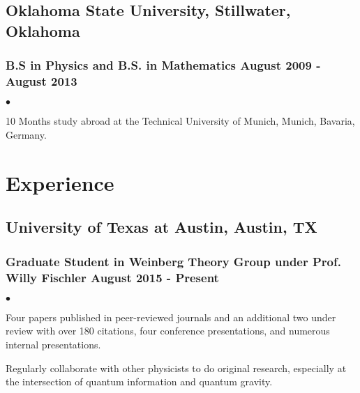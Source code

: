\documentclass[letterpaper]{article}
\renewenvironment{itemize}{
  \begin{list}{$\bullet$}{
    \setlength{\itemsep}{0em}
    \setlength{\parskip}{0em}
    \setlength{\parsep}{0em} 
    \setlength{\topsep}{0em} 
  }
}{
  \end{list}
}
\begin{document}
\subsection*{Oklahoma State University, Stillwater, Oklahoma}
\subsubsection*{B.S in Physics and B.S. in Mathematics \hfill August 2009 - August 2013}

\begin{itemize}
\item 10 Months study abroad at the Technical University of Munich, Munich, Bavaria, Germany.
\end{itemize}

\section*{Experience}

\subsection*{University of Texas at Austin, Austin, TX} 
\subsubsection*{Graduate Student in Weinberg Theory Group under Prof. Willy Fischler \hfill August 2015 - Present}
    \begin{itemize}
    
        \item Four papers published in peer-reviewed journals and an additional two under review with over 180 citations, four conference presentations, and numerous internal presentations.
        \item Regularly collaborate with other physicists to do original research, especially at the intersection of quantum information and quantum gravity.
        
    \end{itemize}
    
\end{document}
